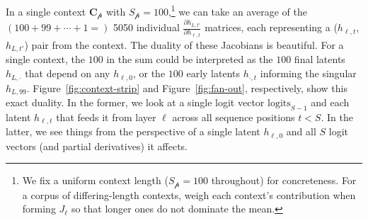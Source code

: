 \documentclass{article}
\newcommand{\logits}{\mathrm{logits}}
\begin{document}
In a single context \(\mathbf{C}_{\mathscr{p}}\) with \(S_{\mathscr{p}} =  100\),\footnote{We fix a uniform context length (\(S_{\mathscr{p}} = 100\) throughout) for concreteness. For a corpus of differing-length contexts, weigh each context's contribution when forming \(J_\ell\) so that longer ones do not dominate the mean.} we can take an average of the \((100 + 99 + \cdots + 1 =)\) 5050 individual \(\frac{\partial h_{L,t'}}{\partial h_{\ell,t}}\) matrices, each representing a (\(h_{\ell,t}\), \(h_{L, t'}\)) pair from the context. The duality of these Jacobians is beautiful. For a single context, the \(100\) in the sum could be interpreted as the \(100\) final latents \(h_{L,\cdot}\) that depend on any \(h_{\ell,0}\), or the \(100\) early latents \(h_{\cdot,t}\) informing the singular \(h_{L,99}\). Figure~\ref{fig:context-strip} and Figure~\ref{fig:fan-out}, respectively, show this exact duality. In the former, we look at a single logit vector \(\logits_{S-1}\) and each latent \(h_{\ell,t}\) that feeds it from layer \(\ell\) across all sequence positions \(t < S\). In the latter, we see things from the perspective of a single latent \(h_{\ell,0}\) and all \(S\) logit vectors (and partial derivatives) it affects. 
\end{document}
